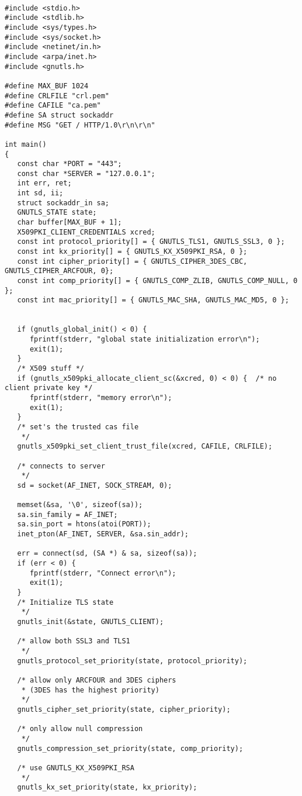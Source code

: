 \begin{verbatim}

#include <stdio.h>
#include <stdlib.h>
#include <sys/types.h>
#include <sys/socket.h>
#include <netinet/in.h>
#include <arpa/inet.h>
#include <gnutls.h>

#define MAX_BUF 1024
#define CRLFILE "crl.pem"
#define CAFILE "ca.pem"
#define SA struct sockaddr
#define MSG "GET / HTTP/1.0\r\n\r\n"

int main()
{
   const char *PORT = "443";
   const char *SERVER = "127.0.0.1";
   int err, ret;
   int sd, ii;
   struct sockaddr_in sa;
   GNUTLS_STATE state;
   char buffer[MAX_BUF + 1];
   X509PKI_CLIENT_CREDENTIALS xcred;
   const int protocol_priority[] = { GNUTLS_TLS1, GNUTLS_SSL3, 0 };
   const int kx_priority[] = { GNUTLS_KX_X509PKI_RSA, 0 };
   const int cipher_priority[] = { GNUTLS_CIPHER_3DES_CBC, GNUTLS_CIPHER_ARCFOUR, 0};
   const int comp_priority[] = { GNUTLS_COMP_ZLIB, GNUTLS_COMP_NULL, 0 };
   const int mac_priority[] = { GNUTLS_MAC_SHA, GNUTLS_MAC_MD5, 0 };


   if (gnutls_global_init() < 0) {
      fprintf(stderr, "global state initialization error\n");
      exit(1);
   }
   /* X509 stuff */
   if (gnutls_x509pki_allocate_client_sc(&xcred, 0) < 0) {  /* no client private key */
      fprintf(stderr, "memory error\n");
      exit(1);
   }
   /* set's the trusted cas file
    */
   gnutls_x509pki_set_client_trust_file(xcred, CAFILE, CRLFILE);

   /* connects to server 
    */
   sd = socket(AF_INET, SOCK_STREAM, 0);

   memset(&sa, '\0', sizeof(sa));
   sa.sin_family = AF_INET;
   sa.sin_port = htons(atoi(PORT));
   inet_pton(AF_INET, SERVER, &sa.sin_addr);

   err = connect(sd, (SA *) & sa, sizeof(sa));
   if (err < 0) {
      fprintf(stderr, "Connect error\n");
      exit(1);
   }
   /* Initialize TLS state 
    */
   gnutls_init(&state, GNUTLS_CLIENT);

   /* allow both SSL3 and TLS1
    */
   gnutls_protocol_set_priority(state, protocol_priority);

   /* allow only ARCFOUR and 3DES ciphers
    * (3DES has the highest priority)
    */
   gnutls_cipher_set_priority(state, cipher_priority);

   /* only allow null compression
    */
   gnutls_compression_set_priority(state, comp_priority);

   /* use GNUTLS_KX_X509PKI_RSA
    */
   gnutls_kx_set_priority(state, kx_priority);


\end{verbatim}
